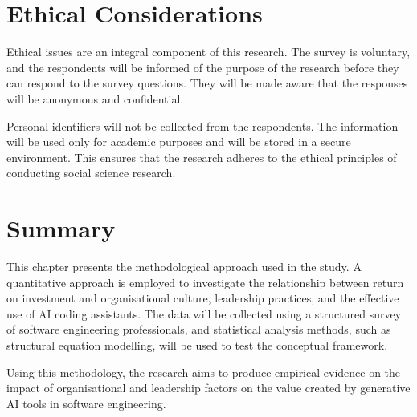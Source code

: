 \section{Ethical Considerations}
\label{sec:Ethical Considerations}
Ethical issues are an integral component of this research. The survey is voluntary, and the respondents will be informed of the purpose of the research before they can respond to the survey questions. They will be made aware that the responses will be anonymous and confidential.

Personal identifiers will not be collected from the respondents. The information will be used only for academic purposes and will be stored in a secure environment. This ensures that the research adheres to the ethical principles of conducting social science research.

\section{Summary}
\label{sec:Summary}
This chapter presents the methodological approach used in the study. A quantitative approach is employed to investigate the relationship between return on investment and organisational culture, leadership practices, and the effective use of AI coding assistants. The data will be collected using a structured survey of software engineering professionals, and statistical analysis methods, such as structural equation modelling, will be used to test the conceptual framework.

Using this methodology, the research aims to produce empirical evidence on the impact of organisational and leadership factors on the value created by generative AI tools in software engineering.
